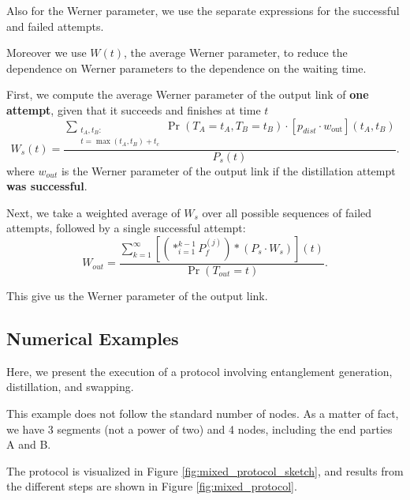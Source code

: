 \documentclass{masterthesis}
\begin{document}
Also for the Werner parameter, we use the separate expressions for the successful and failed attempts. 

Moreover we use $W(t)$, the average Werner parameter, to reduce the dependence on Werner parameters to the dependence on the waiting time.

First, we compute the average Werner parameter of the output link of \textbf{one attempt}, given that it succeeds and finishes at time $t$
\begin{equation}
    W_s(t) = \frac{\sum_{\substack{t_A, t_B : \\ t = \max(t_A, t_B) + t_c}} \Pr(T_A = t_A, T_B = t_B) \cdot [p_{dist} \cdot w_{\text{out}}](t_A, t_B)}{P_s(t)}.
\end{equation}
where $w_{out}$ is the Werner parameter of the output link if the distillation attempt \textbf{was successful}.

Next, we take a weighted average of $W_s$ over all possible sequences of failed attempts, followed by a single successful attempt:
\begin{equation}\label{eq:werner_parameter_distillation}
    W_{out} = \frac{\sum_{k=1}^{\infty} \left[ \left( \ast_{i=1}^{k-1} P_f^{(j)} \right) \ast (P_s \cdot W_s) \right] (t)}{\Pr(T_{out} = t)}.
\end{equation}

This give us the Werner parameter of the output link.

\subsection*{Numerical Examples}

Here, we present the execution of a protocol involving entanglement generation, distillation, and swapping.

This example does not follow the standard number of nodes. As a matter of fact, we have 3 segments (not a power of two) and 4 nodes, including the end parties A and B.

The protocol is visualized in Figure \ref{fig:mixed_protocol_sketch}, and results from the different steps are shown in Figure \ref{fig:mixed_protocol}.
\end{document}
